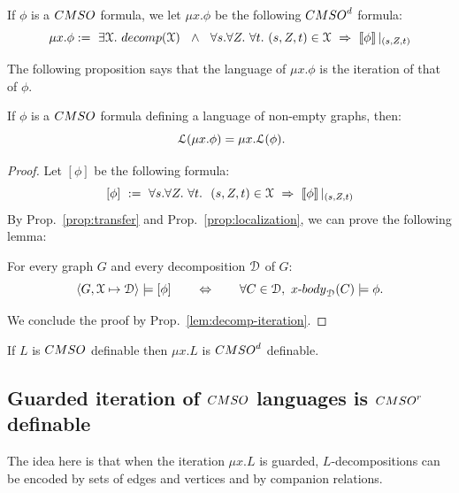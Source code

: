 \begin{definition}\label{def:iteration}
If $\phi$ is a $\CMSO$ formula, we let $\mu x. \phi$ be the following $\CMSOd$ formula: $$\mu x. \phi:=\ \exists\cX.\ \mathsf{decomp}(\cX)\ \ \wedge\ \ \forall s. \forall Z.\ \forall t.\ (s,Z,t)\in\cX\ \Rightarrow\ \tms{\phi}|_{(s,Z,t)}$$
\end{definition}
The following proposition says that  the language of $\mu x. \phi$ is the iteration of that of $\phi$. 
\begin{proposition}\label{prop:lang-iteration} If $\phi$ is a $\CMSO$ formula defining a language of non-empty graphs, then: $$\ \cL(\mu x. \phi)=\mu x. \cL(\phi).$$
\end{proposition}
\begin{proof} Let $[\phi]$ be the following formula:
$$[\phi]\ :=\ \forall s.\forall Z.\ \forall t.\ \ (s,Z,t)\in\cX\ \Rightarrow\  \tms{\phi}|_{(s,Z,t)}$$  By Prop.~\ref{prop:transfer} and Prop.~\ref{prop:localization}, we can prove the following lemma:
\begin{lemma}
For every graph $G$ and every decomposition $\mathcal D$ of $G$:
$$\langle G,\cX\mapsto\cD\rangle \models[\phi]\qquad \Leftrightarrow \qquad  \forall C\in \cD, \ \text{$x$-}\mathsf{body}_\cD(C)\models \phi.$$
\end{lemma}
We conclude the proof by Prop.~\ref{lem:decomp-iteration}.
\end{proof}

\begin{corollary}
If $L$ is $\CMSO$ definable then  $\mu x. L$ is $\CMSOd$ definable.
\end{corollary}

\subsection{Guarded iteration of $\CMSO$ languages is $\CMSO^r$ definable}

The idea here is that when the iteration $\mu x. L$ is guarded, $L$-decompositions can be encoded by sets of edges and vertices and by companion relations.


